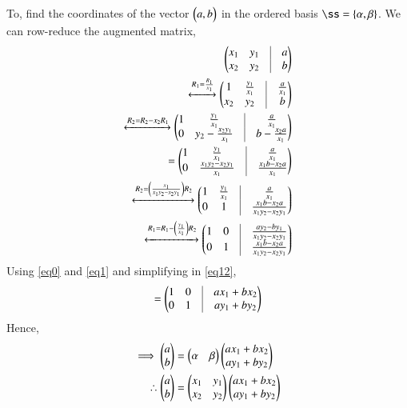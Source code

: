 \documentclass[journal,12pt,twocolumn]{IEEEtran}
\begin{document}
To, find the coordinates of the vector $\begin{pmatrix}a,b\end{pmatrix}$ in the ordered basis $\ss=\{\vec{\alpha},\vec{\beta}\}$. We
can row-reduce the augmented matrix,
   \begin{align}
      \myvec{x_1&y_1&\vrule&a\\x_2&y_2&\vrule&b}\\
        \xleftrightarrow{R_1=\frac{R_1}{x_1}}\myvec{1&\frac{y_1}{x_1}&\vrule&\frac{a}{x_1}\\x_2&y_2&\vrule&b}\\
     \xleftrightarrow{R_2=R_2-x_2R_1}\myvec{1&\frac{y_1}{x_1}&\vrule&\frac{a}{x_1}\\0&y_2-\frac{x_2y_1}{x_1}&\vrule&b-\frac{x_2a}{x_1}}\\
     =\myvec{1&\frac{y_1}{x_1}&\vrule&\frac{a}{x_1}\\0&\frac{x_1y_2-x_2y_1}{x_1}&\vrule&\frac{x_1b-x_2a}{x_1}}\\
      \xleftrightarrow{R_2=\left(\frac{x_1}{x_1y_2-x_2y_1}\right)R_2}\myvec{1&\frac{y_1}{x_1}&\vrule&\frac{a}{x_1}\\0&1&\vrule&\frac{x_1b-x_2a}{x_1y_2-x_2y_1}}\\
      \xleftrightarrow{R_1=R_1-\left(\frac{y_1}{x_1}\right)R_2}\myvec{1&0&\vrule&\frac{ay_2-by_1}{x_1y_2-x_2y_1}\\0&1&\vrule&\frac{x_1b-x_2a}{x_1y_2-x_2y_1}}\label{eq12}
\end{align}
Using \ref{eq0} and \ref{eq1} and simplifying in \ref{eq12},
\begin{align}
=\myvec{1&0&\vrule&ax_1+bx_2\\0&1&\vrule&ay_1+by_2}
\end{align}
Hence,
\begin{align}
\implies \begin{pmatrix}a\\b\end{pmatrix}&=\begin{pmatrix}\alpha & \beta\end{pmatrix}\begin{pmatrix}ax_1+bx_2\\ay_1+by_2\end{pmatrix}\\
 \therefore \begin{pmatrix}a\\b\end{pmatrix}&=\begin{pmatrix}x_1&y_1 \\ x_2&y_2\end{pmatrix}\begin{pmatrix}ax_1+bx_2\\ay_1+by_2\end{pmatrix}
\end{align}
\end{document}
